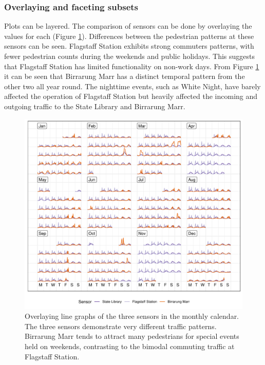 \documentclass[12pt]{article}
\begin{document}
\hypertarget{overlaying-and-faceting-subsets}{%
\subsubsection{Overlaying and faceting subsets}\label{overlaying-and-faceting-subsets}}

Plots can be layered. The comparison of sensors can be done by overlaying the values for each (Figure \ref{fig:overlay}). Differences between the pedestrian patterns at these sensors can be seen. Flagstaff Station exhibits strong commuters patterns, with fewer pedestrian counts during the weekends and public holidays. This suggests that Flagstaff Station has limited functionality on non-work days. From Figure \ref{fig:overlay} it can be seen that Birrarung Marr has a distinct temporal pattern from the other two all year round. The nighttime events, such as White Night, have barely affected the operation of Flagstaff Station but heavily affected the incoming and outgoing traffic to the State Library and Birrarung Marr.

\begin{figure}

{\centering \includegraphics[width=\textwidth]{figure/overlay-1} 

}

\caption{Overlaying line graphs of the three sensors in the monthly calendar. The three sensors demonstrate very different traffic patterns. Birrarung Marr tends to attract many pedestrians for special events held on weekends, contrasting to the bimodal commuting traffic at Flagstaff Station.}\label{fig:overlay}
\end{figure}
\end{document}
